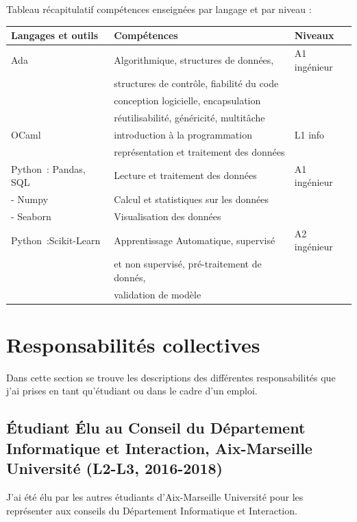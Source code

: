 \documentclass[11pt,a4paper,oneside]{article}
\begin{document}
Tableau récapitulatif compétences enseignées par langage et par niveau :
\begin{center}
	\begin{tabular}{|l|l|l|}
		\hline
		Langages  et outils  & Compétences                                 & Niveaux      \\
		\hline
		Ada                  & Algorithmique, structures de données,       & A1 ingénieur \\
		                     & structures de contrôle, fiabilité du code   &              \\
		                     & conception logicielle, encapsulation        &              \\
		                     & réutilisabilité, généricité, multitâche     &              \\
		\hline
		OCaml                & introduction à la programmation             & L1 info      \\
		                     & représentation et traitement des données    &              \\
		\hline
		Python~: Pandas, SQL & Lecture et traitement des données           & A1 ingénieur \\
		- Numpy              & Calcul et statistiques sur les données      &              \\
		- Seaborn            & Visualisation des données                   &              \\
		\hline
		Python~:Scikit-Learn & Apprentissage Automatique, supervisé        & A2 ingénieur \\
		                     & et non supervisé, pré-traitement de donnés, &              \\
		                     & validation de modèle                        &              \\
		\hline
	\end{tabular}
\end{center}

\section{Responsabilités collectives}

Dans cette section se trouve les descriptions des différentes responsabilités
que j'ai prises en tant qu'étudiant ou dans le cadre d'un emploi. %

\subsection{Étudiant Élu au Conseil du Département Informatique et Interaction,
	Aix-Marseille Université (L2-L3, 2016-2018)}
J'ai été élu par les autres étudiants d'Aix-Marseille Université pour les
représenter aux conseils du Département Informatique et Interaction.
\end{document}
